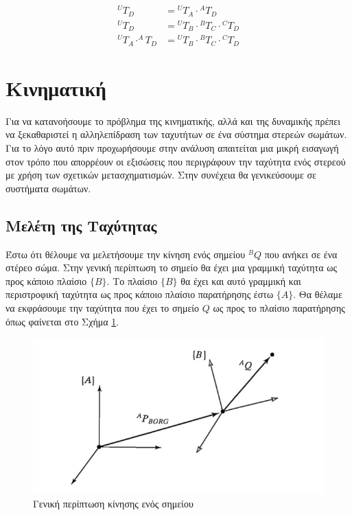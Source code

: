 \begin{equation}
    \begin{split}
        ^UT_D &= {}^UT_A \cdot {}^AT_D\\[10pt]
        ^UT_D &= {}^UT_B \cdot {}^BT_C \cdot {}^CT_D\\[10pt]
        ^UT_A \cdot ^AT_D &= {}^UT_B \cdot {}^BT_C \cdot {}^CT_D
    \end{split}
    \label{equ:chain}
\end{equation}

\section{Κινηματική}

Για να κατανοήσουμε το πρόβλημα της κινηματικής, αλλά και της δυναμικής πρέπει να ξεκαθαριστεί η αλληλεπίδραση των ταχυτήτων σε ένα σύστημα στερεών σωμάτων. Για το λόγο αυτό πριν προχωρήσουμε στην ανάλυση απαιτείται μια μικρή εισαγωγή στον τρόπο που απορρέουν οι εξισώσεις που περιγράφουν την ταχύτητα ενός στερεού με χρήση των σχετικών μετασχηματισμών. Στην συνέχεια θα γενικεύσουμε σε συστήματα σωμάτων.

\subsection{Μελέτη της Ταχύτητας}

Έστω ότι θέλουμε να μελετήσουμε την κίνηση ενός σημείου $^BQ$ που ανήκει σε ένα στέρεο σώμα. Στην γενική περίπτωση το σημείο θα έχει μια γραμμική ταχύτητα ως προς κάποιο πλαίσιο $\{Β\}$. Το πλαίσιο $\{Β\}$ θα έχει και αυτό γραμμική και περιστροφική ταχύτητα ως προς κάποιο πλαίσιο παρατήρησης έστω $\{Α\}$. Θα θέλαμε να εκφράσουμε την ταχύτητα που έχει το σημείο $Q$ ως προς το πλαίσιο παρατήρησης όπως φαίνεται στο Σχήμα \ref{fig:velocity}.

\begin{figure}[H]
    \centering
    \includegraphics[width=.8\textwidth, keepaspectratio]{fig/velocity.png}
    \caption{Γενική περίπτωση κίνησης ενός σημείου \cite{craig95}}
    \label{fig:velocity}
\end{figure}

